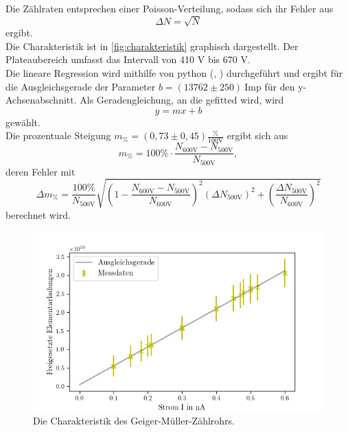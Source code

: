 Die Zählraten entsprechen einer Poisson-Verteilung, sodass sich ihr Fehler aus 
\begin{equation*}
  \Delta N = \sqrt{N}
\end{equation*}
ergibt.\\
Die Charakteristik ist in \autoref{fig:charakteristik} graphisch dargestellt.
Der Plateaubereich umfasst das Intervall von 410 V bis 670 V.\\
Die lineare Regression wird mithilfe von python (\cite{numpy}, \cite{uncertainties}) durchgeführt und ergibt
für die Ausgleichsgerade der Parameter $b = (13762 \pm 250)  \: \mathrm{Imp}$ für den y-Achsenabschnitt.
Als Geradengleichung, an die gefitted wird, wird 
\begin{equation*}
  y = mx + b
\end{equation*}
gewählt.\\
Die prozentuale Steigung $m_{\%} = (0,73 \pm 0,45) \mathrm{\frac{\%}{100 V}}$ ergibt sich aus 
\begin{equation*}
  m_{\%} = 100\% \cdot \frac{N_{\mathrm{600V}} - N_{\mathrm{500V}}}{N_{\mathrm{500V}}},
\end{equation*}
deren Fehler mit
\begin{equation*}
  \Delta m_{\%} = \frac{100\%}{N_{\mathrm{500V}}} \sqrt{(1 - \frac{N_{\mathrm{600V}} - N_{\mathrm{500V}}}{N_{\mathrm{600V}}})^2 (\Delta N_{\mathrm{500V}})^2 + (\frac{\Delta N_{\mathrm{500V}}}{N_{\mathrm{600V}}})^2}
\end{equation*}
berechnet wird.

\begin{figure}[H]
  \centering
  \includegraphics{content/hobelneu.png}
  \caption{Die Charakteristik des Geiger-Müller-Zählrohrs.}
  \label{fig:charakteristik}
\end{figure}


